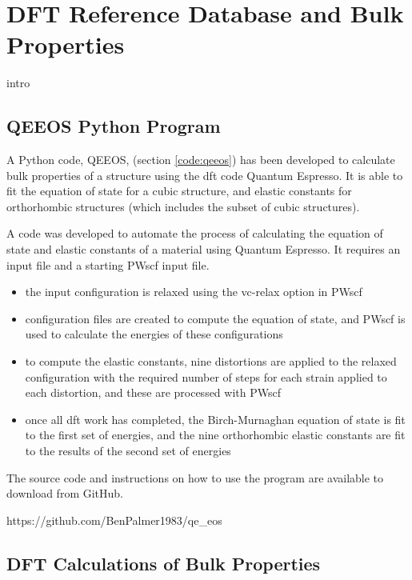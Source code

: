 
\section[DFT Results]{DFT Reference Database and Bulk Properties}

intro


\subsection{QEEOS Python Program}
\label{section:qeeospyprog}

A Python code, QEEOS, (section \ref{code:qeeos}) has been developed to calculate bulk properties of a structure using the \acrshort{dft} code Quantum Espresso.  It is able to fit the equation of state for a cubic structure, and elastic constants for orthorhombic structures (which includes the subset of cubic structures).  

A code was developed to automate the process of calculating the equation of state and elastic constants of a material using Quantum Espresso.  It requires an input file and a starting PWscf input file.  

\begin{itemize}
\item the input configuration is relaxed using the vc-relax option in PWscf
\item configuration files are created to compute the equation of state, and PWscf is used to calculate the energies of these configurations
\item to compute the elastic constants, nine distortions are applied to the relaxed configuration with the required number of steps for each strain applied to each distortion, and these are processed with PWscf
\item once all \acrshort{dft} work has completed, the Birch-Murnaghan equation of state is fit to the first set of energies, and the nine orthorhombic elastic constants are fit to the results of the second set of energies
\end{itemize}

The source code and instructions on how to use the program are available to download from GitHub.

https://github.com/BenPalmer1983/qe\_eos



\subsection{DFT Calculations of Bulk Properties}

